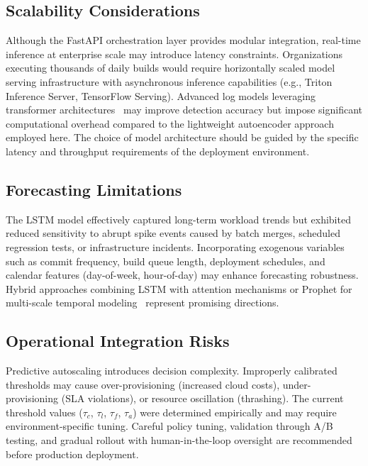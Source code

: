 \documentclass[sn-nature]{sn-jnl}
\theoremstyle{thmstyleone}
\theoremstyle{thmstyletwo}
\theoremstyle{thmstylethree}
\begin{document}
\subsection{Scalability Considerations}\label{subsec:scalability}

Although the FastAPI orchestration layer provides modular integration, real-time inference at enterprise scale may introduce latency constraints.
Organizations executing thousands of daily builds would require horizontally scaled model serving infrastructure with asynchronous inference capabilities (e.g., Triton Inference Server, TensorFlow Serving).
Advanced log models leveraging transformer architectures~\cite{liao2025logtransformer, vaswani2017attention} may improve detection accuracy but impose significant computational overhead compared to the lightweight autoencoder approach employed here.
The choice of model architecture should be guided by the specific latency and throughput requirements of the deployment environment.

\subsection{Forecasting Limitations}\label{subsec:forecastlimit}

The LSTM model effectively captured long-term workload trends but exhibited reduced sensitivity to abrupt spike events caused by batch merges, scheduled regression tests, or infrastructure incidents.
Incorporating exogenous variables such as commit frequency, build queue length, deployment schedules, and calendar features (day-of-week, hour-of-day) may enhance forecasting robustness.
Hybrid approaches combining LSTM with attention mechanisms or Prophet for multi-scale temporal modeling~\cite{guruge2025prophet} represent promising directions.

\subsection{Operational Integration Risks}\label{subsec:oprisk}

Predictive autoscaling introduces decision complexity. Improperly calibrated thresholds may cause over-provisioning (increased cloud costs), under-provisioning (SLA violations), or resource oscillation (thrashing).
The current threshold values ($\tau_c$, $\tau_l$, $\tau_f$, $\tau_a$) were determined empirically and may require environment-specific tuning.
Careful policy tuning, validation through A/B testing, and gradual rollout with human-in-the-loop oversight are recommended before production deployment.
\end{document}
